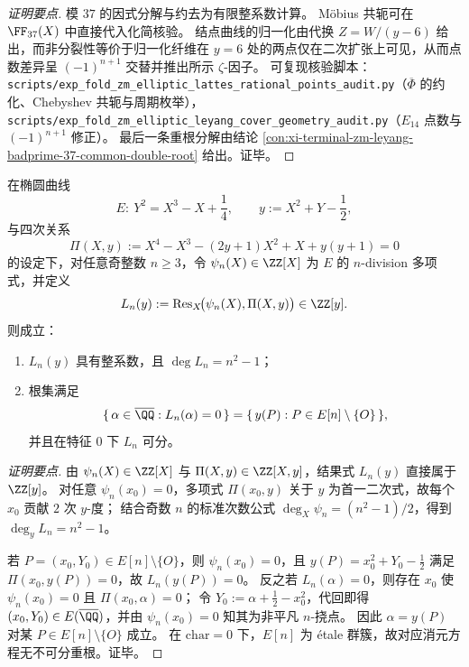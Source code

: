 \begin{proof}[证明要点]
模 \(37\) 的因式分解与约去为有限整系数计算。
Möbius 共轭可在 \(\FF_{37}(X)\) 中直接代入化简核验。
结点曲线的归一化由代换 \(Z=W/(y-6)\) 给出，而非分裂性等价于归一化纤维在 \(y=6\) 处的两点仅在二次扩张上可见，从而点数差异呈 \((-1)^{n+1}\) 交替并推出所示 \(\zeta\)-因子。
可复现核验脚本：\texttt{scripts/exp\_fold\_zm\_elliptic\_lattes\_rational\_points\_audit.py}（\(\overline{\Phi}\) 的约化、Chebyshev 共轭与周期枚举），\texttt{scripts/exp\_fold\_zm\_elliptic\_leyang\_cover\_geometry\_audit.py}（\(E_{14}\) 点数与 \((-1)^{n+1}\) 修正）。
最后一条重根分解由结论 \ref{con:xi-terminal-zm-leyang-badprime-37-common-double-root} 给出。证毕。
\end{proof}

\begin{conclusion}\label{con:xi-terminal-zm-elliptic-division-resultant-integrality-degree}
在椭圆曲线
\[
E:\ Y^{2}=X^{3}-X+\frac14,
\qquad
y:=X^{2}+Y-\frac12,
\]
与四次关系
\[
\Pi(X,y):=X^{4}-X^{3}-(2y+1)X^{2}+X+y(y+1)=0
\]
的设定下，对任意奇整数 \(n\ge 3\)，令 \(\psi_{n}(X)\in\ZZ[X]\) 为 \(E\) 的 \(n\)-division 多项式，并定义
\[
L_{n}(y):=\operatorname{Res}_{X}\!\bigl(\psi_{n}(X),\Pi(X,y)\bigr)\in\ZZ[y].
\]
则成立：
\begin{enumerate}
  \item \(L_{n}(y)\) 具有整系数，且 \(\deg L_{n}=n^{2}-1\)；
  \item 根集满足
  \[
  \{\,\alpha\in\overline{\QQ}:L_{n}(\alpha)=0\,\}
  =\{\,y(P):P\in E[n]\setminus\{O\}\,\},
  \]
  并且在特征 \(0\) 下 \(L_n\) 可分。
\end{enumerate}
\end{conclusion}
\begin{proof}[证明要点]
由 \(\psi_n(X)\in\ZZ[X]\) 与 \(\Pi(X,y)\in\ZZ[X,y]\)，结果式 \(L_n(y)\) 直接属于 \(\ZZ[y]\)。
对任意 \(\psi_n(x_0)=0\)，多项式 \(\Pi(x_0,y)\) 关于 \(y\) 为首一二次式，故每个 \(x_0\) 贡献 \(2\) 次 \(y\)-度；
结合奇数 \(n\) 的标准次数公式 \(\deg_X\psi_n=(n^2-1)/2\)，得到 \(\deg_y L_n=n^2-1\)。
\par
若 \(P=(x_0,Y_0)\in E[n]\setminus\{O\}\)，则 \(\psi_n(x_0)=0\)，且 \(y(P)=x_0^2+Y_0-\tfrac12\) 满足 \(\Pi(x_0,y(P))=0\)，故 \(L_n(y(P))=0\)。
反之若 \(L_n(\alpha)=0\)，则存在 \(x_0\) 使 \(\psi_n(x_0)=0\) 且 \(\Pi(x_0,\alpha)=0\)；
令 \(Y_0:=\alpha+\tfrac12-x_0^2\)，代回即得 \((x_0,Y_0)\in E(\overline{\QQ})\)，并由 \(\psi_n(x_0)=0\) 知其为非平凡 \(n\)-挠点。
因此 \(\alpha=y(P)\) 对某 \(P\in E[n]\setminus\{O\}\) 成立。
在 \(\mathrm{char}=0\) 下，\(E[n]\) 为 étale 群簇，故对应消元方程无不可分重根。证毕。
\end{proof}

